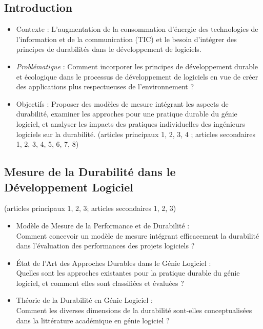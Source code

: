 \subsection{Introduction}
\begin{itemize}
    \item Contexte : L'augmentation de la consommation d'énergie des technologies de l'information et de la communication (TIC) et le besoin d'intégrer des principes de durabilités dans le développement de logiciels.
    \item \textit{Problématique} : Comment incorporer les principes de développement durable et écologique dans le processus de développement de logiciels en vue de créer des applications plus respectueuses de l'environnement ?
    \item Objectifs : Proposer des modèles de mesure intégrant les aspects de durabilité, examiner les approches pour une pratique durable du génie logiciel, et analyser les impacts des pratiques individuelles des ingénieurs logiciels sur la durabilité. (articles principaux 1, 2, 3, 4 ; articles secondaires 1, 2, 3, 4, 5, 6, 7, 8)
\end{itemize}

\subsection{Mesure de la Durabilité dans le Développement Logiciel} (articles principaux 1, 2, 3; articles secondaires 1, 2, 3)
\begin{itemize}
    \item Modèle de Mesure de la Performance et de Durabilité : \\
    Comment concevoir un modèle de mesure intégrant efficacement la durabilité dans l'évaluation des performances des projets logiciels ?
    \item État de l'Art des Approches Durables dans le Génie Logiciel : \\
    Quelles sont les approches existantes pour la pratique durable du génie logiciel, et comment elles sont classifiées et évaluées ?
    \item Théorie de la Durabilité en Génie Logiciel : \\
    Comment les diverses dimensions de la durabilité sont-elles conceptualisées dans la littérature académique en génie logiciel ?
\end{itemize}

